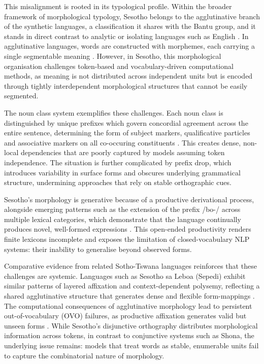 \documentclass[12pt]{ThesisRU}
\begin{document}
This misalignment is rooted in its typological profile. Within the broader framework of morphological typology, Sesotho belongs to the agglutinative branch of the synthetic languages, a classification it shares with the Bantu group, and it stands in direct contrast to analytic or isolating languages such as English \citep{kambarami2021out,masethe2022word}. In agglutinative languages, words are constructed with morphemes, each carrying a single segmentable meaning \citep{kambarami2021out}. However, in Sesotho, this morphological organisation challenges token-based and vocabulary-driven computational methods, as meaning is not distributed across independent units but is encoded through tightly interdependent morphological structures that cannot be easily segmented. 

The noun class system exemplifies these challenges. Each noun class is distinguished by unique prefixes which govern concordial agreement across the entire sentence, determining the form of subject markers, qualificative particles and associative markers on all co-occuring constituents \citep{mokoaleli2020sesotho}. This creates dense, non-local dependencies that are poorly captured by models assuming token independence. The situation is further complicated by prefix drop, which introduces variability in surface forms and obscures underlying grammatical structure, undermining approaches that rely on stable orthographic cues.

Sesotho's morphology is generative because of a productive derivational process, alongside emerging patterns such as the extension of the prefix /bo-/ across multiple lexical categories, which demonstrate that the language continually produces novel, well-formed expressions \citep{mokoaleli2020sesotho,moloi2014morphology}. This open-ended productivity renders finite lexicons incomplete and exposes the limitation of closed-vocabulary NLP systems: their inability to generalise beyond observed forms.

Comparative evidence from related Sotho-Tswana languages reinforces that these challenges are systemic. Languages such as Sesotho sa Leboa (Sepedi) exhibit similar patterns of layered affixation and context-dependent polysemy, reflecting a shared agglutinative structure that generates dense and flexible form-mappings \citep{masethe2022word}. The computational consequences of agglutinative morphology lead to persistent out-of-vocabulary (OVO) failures, as productive affixation generates valid but unseen forms \citep{kambarami2021out}. While Sesotho's disjunctive orthography distributes morphological information across tokens, in contrast to conjunctive systems such as Shona, the underlying issue remains: models that treat words as stable, enumerable units fail to capture the combinatorial nature of morphology.
\end{document}

